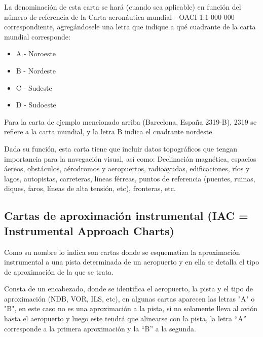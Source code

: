La denominaci\'on de esta carta se har\'a (cuando sea aplicable) en funci\'on del n\'umero de referencia de la Carta aeron\'autica mundial - OACI 1:1 000 000 correspondiente, agreg\'andosele una letra que indique a qu\'e cuadrante de la carta mundial corresponde:

\begin{multicols}{2}
  \begin{itemize}
  \item A - Noroeste

  \item B - Nordeste

  \item C - Sudeste

  \item D - Sudoeste
  \end{itemize}
\end{multicols}

Para la carta de ejemplo mencionado arriba (Barcelona, Espa\~na 2319-B), 2319 se refiere a la carta mundial, y la letra B indica el cuadrante nordeste.

Dada su funci\'on, esta carta tiene que incluir datos topogr\'aficos que tengan importancia para la navegaci\'on visual, as\'i como: Declinaci\'on magn\'etica, espacios \'aereos, obst\'aculos, a\'erodromos y aeropuertos, radioayudas, edificaciones, r\'ios y lagos, autopistas, carreteras, l\'ineas f\'erreas, puntos de referencia (puentes, ruinas, diques, faros, l\'ineas de alta tensi\'on, etc), fronteras, etc. 

\subsection{Cartas de aproximaci\'on instrumental (IAC = Instrumental Approach Charts)
}
\label{sec:cart-de-aproximacion}

Como su nombre lo indica son cartas donde se esquematiza la aproximaci\'on
instrumental a una pista determinada de un aeropuerto y en ella se detalla el
tipo de aproximaci\'on de la que se trata.

Consta de un encabezado, donde se identifica el aeropuerto, la pista y el tipo
de aproximaci\'on (NDB, VOR, ILS, etc), en algunas cartas aparecen las letras
"A" o "B", en este caso no es una aproximaci\'on a la pista, si no solamente
lleva al avi\'on hasta el aeropuerto y luego este tendr\'a que alinearse con la
pista, la letra ``A'' corresponde a la primera aproximaci\'on y la ``B'' a la
segunda.

